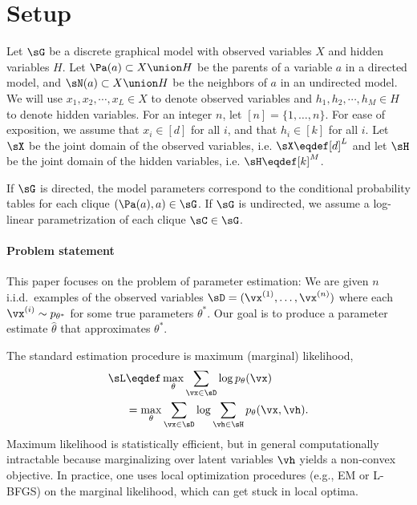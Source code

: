\section{Setup}
\label{sec:setup}

Let $\sG$ be a discrete graphical model with observed variables $X$ and
  hidden variables $H$.
Let $\Pa(a) \subset X \union H$ be the parents of a variable $a$ in a directed
  model, and $\sN(a) \subset X \union H$ be the neighbors of $a$ in an
  undirected model.
We will use $x_1, x_2, \cdots, x_L \in X$ to denote observed variables and
  $h_1, h_2, \cdots, h_M \in H$ to denote hidden variables.
For an integer $n$, let $[n] = \{ 1, \dots, n \}$.
For ease of exposition, we assume that $x_i \in [d]$ for
all $i$, and that $h_i \in [k]$ for all $i$.
Let $\sX$ be the joint domain of the observed variables, i.e. $\sX \eqdef [d]^L$ and
let $\sH$ be the joint domain of the hidden variables, i.e. $\sH \eqdef [k]^M$.

If $\sG$ is directed, the model parameters correspond to
the conditional probability tables for each clique $(\Pa(a), a) \in \sG$.
If $\sG$ is undirected, we assume a log-linear parametrization of each clique $\sC \in \sG$.

\paragraph{Problem statement}

This paper focuses on the problem of parameter estimation:
We are given $n$ i.i.d.~examples of the observed variables $\sD
  = (\vx^{(1)}, \dots, \vx^{(n)})$ where each $\vx^{(i)} \sim p_{\theta^*}$ for
  some true parameters $\theta^*$.
Our goal is to produce a parameter estimate $\hat\theta$ that
  approximates $\theta^*$.

The standard estimation procedure is maximum (marginal) likelihood,
  \begin{align*}
    \sL &\eqdef \max_{\theta} \sum_{\vx \in \sD} \log p_\theta(\vx) \\
        &=      \max_{\theta} \sum_{\vx \in \sD} \log \sum_{\vh \in \sH} p_\theta(\vx,\vh).
  \end{align*}
  Maximum likelihood is statistically efficient,
  but in general computationally intractable
  because marginalizing over latent variables $\vh$ yields a non-convex objective.
In practice, one uses local optimization procedures (e.g., EM
  or L-BFGS) on the marginal likelihood, which can get stuck in local
  optima.

